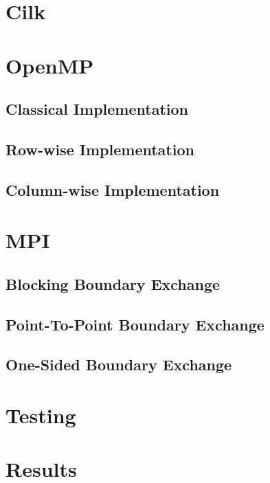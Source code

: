 \documentclass[11pt,a4paper]{article}
\begin{document}
\section{Cilk}


\section{OpenMP}
\subsection{Classical Implementation}
\subsection{Row-wise Implementation}
\subsection{Column-wise Implementation}

\section{MPI}
\subsection{Blocking Boundary Exchange}
\subsection{Point-To-Point Boundary Exchange}
\subsection{One-Sided Boundary Exchange}

\section{Testing}

\section{Results}
\end{document}
